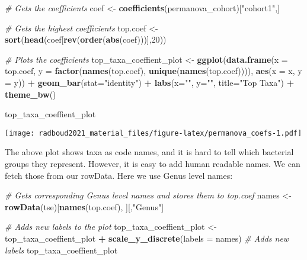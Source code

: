 \documentclass[
  oneside]{book}
\newenvironment{Shaded}{\begin{snugshade}}{\end{snugshade}}
\newcommand{\CommentTok}[1]{\textcolor[rgb]{0.56,0.35,0.01}{\textit{#1}}}
\newcommand{\DataTypeTok}[1]{\textcolor[rgb]{0.13,0.29,0.53}{#1}}
\newcommand{\DecValTok}[1]{\textcolor[rgb]{0.00,0.00,0.81}{#1}}
\newcommand{\KeywordTok}[1]{\textcolor[rgb]{0.13,0.29,0.53}{\textbf{#1}}}
\newcommand{\NormalTok}[1]{#1}
\newcommand{\OperatorTok}[1]{\textcolor[rgb]{0.81,0.36,0.00}{\textbf{#1}}}
\newcommand{\StringTok}[1]{\textcolor[rgb]{0.31,0.60,0.02}{#1}}
\begin{document}
\begin{Shaded}
\begin{Highlighting}[]
\CommentTok{# Gets the coefficients}
\NormalTok{coef <-}\StringTok{ }\KeywordTok{coefficients}\NormalTok{(permanova_cohort)[}\StringTok{"cohort1"}\NormalTok{,]}

\CommentTok{# Gets the highest coefficients}
\NormalTok{top.coef <-}\StringTok{ }\KeywordTok{sort}\NormalTok{(}\KeywordTok{head}\NormalTok{(coef[}\KeywordTok{rev}\NormalTok{(}\KeywordTok{order}\NormalTok{(}\KeywordTok{abs}\NormalTok{(coef)))],}\DecValTok{20}\NormalTok{))}

\CommentTok{# Plots the coefficients}
\NormalTok{top_taxa_coeffient_plot <-}\StringTok{ }\KeywordTok{ggplot}\NormalTok{(}\KeywordTok{data.frame}\NormalTok{(}\DataTypeTok{x =}\NormalTok{ top.coef,}
                                             \DataTypeTok{y =} \KeywordTok{factor}\NormalTok{(}\KeywordTok{names}\NormalTok{(top.coef),}
                         \KeywordTok{unique}\NormalTok{(}\KeywordTok{names}\NormalTok{(top.coef)))),}
                                  \KeywordTok{aes}\NormalTok{(}\DataTypeTok{x =}\NormalTok{ x, }\DataTypeTok{y =}\NormalTok{ y)) }\OperatorTok{+}
\StringTok{  }\KeywordTok{geom_bar}\NormalTok{(}\DataTypeTok{stat=}\StringTok{"identity"}\NormalTok{) }\OperatorTok{+}
\StringTok{  }\KeywordTok{labs}\NormalTok{(}\DataTypeTok{x=}\StringTok{""}\NormalTok{, }\DataTypeTok{y=}\StringTok{""}\NormalTok{, }\DataTypeTok{title=}\StringTok{"Top Taxa"}\NormalTok{) }\OperatorTok{+}
\StringTok{  }\KeywordTok{theme_bw}\NormalTok{()}

\NormalTok{top_taxa_coeffient_plot}
\end{Highlighting}
\end{Shaded}

\texttt{[image: radboud2021\_material\_files/figure-latex/permanova\_coefs-1.pdf]}

The above plot shows taxa as code names, and it is hard to tell which
bacterial groups they represent. However, it is easy to add human readable
names. We can fetch those from our rowData. Here we use Genus level names:

\begin{Shaded}
\begin{Highlighting}[]
\CommentTok{# Gets corresponding Genus level names and stores them to top.coef}
\NormalTok{names <-}\StringTok{ }\KeywordTok{rowData}\NormalTok{(tse)[}\KeywordTok{names}\NormalTok{(top.coef), ][,}\StringTok{"Genus"}\NormalTok{]}

\CommentTok{# Adds new labels to the plot}
\NormalTok{top_taxa_coeffient_plot <-}\StringTok{ }\NormalTok{top_taxa_coeffient_plot }\OperatorTok{+}
\StringTok{  }\KeywordTok{scale_y_discrete}\NormalTok{(}\DataTypeTok{labels =}\NormalTok{ names) }\CommentTok{# Adds new labels}
\NormalTok{top_taxa_coeffient_plot}
\end{Highlighting}
\end{Shaded}
\end{document}
